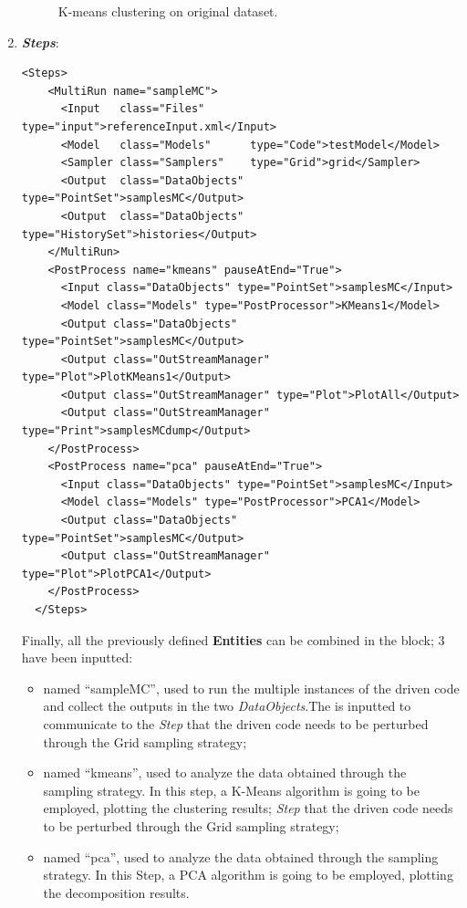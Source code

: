 \begin{enumerate}
\begin{figure}[h!]
  \caption{K-means clustering on original dataset.}
  \label{fig:KmeanOrigData}
 \end{figure}
   \item \textbf{\textit{Steps}}:
\begin{lstlisting}[style=XML,morekeywords={arg,extension,pauseAtEnd,overwrite}]
  <Steps>
    <MultiRun name="sampleMC">
      <Input   class="Files"       type="input">referenceInput.xml</Input>
      <Model   class="Models"      type="Code">testModel</Model>
      <Sampler class="Samplers"    type="Grid">grid</Sampler>
      <Output  class="DataObjects" type="PointSet">samplesMC</Output>
      <Output  class="DataObjects" type="HistorySet">histories</Output>
    </MultiRun>
    <PostProcess name="kmeans" pauseAtEnd="True">
      <Input class="DataObjects" type="PointSet">samplesMC</Input>
      <Model class="Models" type="PostProcessor">KMeans1</Model>
      <Output class="DataObjects" type="PointSet">samplesMC</Output>
      <Output class="OutStreamManager" type="Plot">PlotKMeans1</Output>
      <Output class="OutStreamManager" type="Plot">PlotAll</Output>
      <Output class="OutStreamManager" type="Print">samplesMCdump</Output>
    </PostProcess>
    <PostProcess name="pca" pauseAtEnd="True">
      <Input class="DataObjects" type="PointSet">samplesMC</Input>
      <Model class="Models" type="PostProcessor">PCA1</Model>
      <Output class="DataObjects" type="PointSet">samplesMC</Output>
      <Output class="OutStreamManager" type="Plot">PlotPCA1</Output>
    </PostProcess>
  </Steps>
\end{lstlisting}

   Finally, all the previously defined \textbf{Entities} can be combined in
   the  block;
   3  have been inputted:
   \begin{itemize}
     \item {} named ``sampleMC'', used to run the
     multiple
     instances of the driven code and
     collect the outputs in the two \textit{DataObjects}.The  is inputted to communicate to the
     \textit{Step} that the driven code needs to
     be perturbed through the Grid sampling strategy;
     \item {} named ``kmeans'', used
     to analyze the data obtained through the sampling strategy. In
     this step, a K-Means algorithm is going to be employed, plotting
     the clustering results;
     \textit{Step} that the driven code needs to
     be perturbed through the Grid sampling strategy;
     \item {} named ``pca'', used
     to analyze the data obtained through the sampling strategy. In
     this Step, a PCA algorithm is going to be employed, plotting
     the decomposition results.
   \end{itemize}
\end{enumerate}
